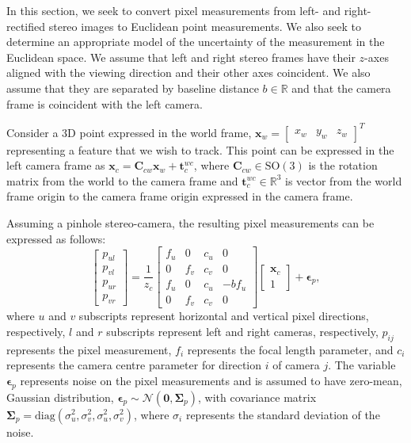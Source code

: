 \documentclass[lettersize,journal]{IEEEtran}
\newcommand{\diag}[1]{\mbox{diag}\left(#1\right)}
\begin{document}
In this section, we seek to convert pixel measurements from left- and right-rectified stereo images to Euclidean point measurements. We also seek to determine an appropriate model of the uncertainty of the measurement in the Euclidean space. We assume that left and right stereo frames have their $z$-axes aligned with the viewing direction and their other axes coincident. We also assume that they are separated by baseline distance $ b\in \mathbb{R} $ and that the camera frame is coincident with the left camera.  

Consider a 3D point expressed in the world frame, $ \bm{x}_w = \begin{bmatrix} x_w & y_w & z_w  \end{bmatrix}^T $ representing a feature that we wish to track. This point can be expressed in the left camera frame as  $ \bm{x}_c = \bm{C}_{cw} \bm{x}_w + \bm{t}^{wc}_c $, where $ \bm{C}_{cw} \in \mbox{SO}(3)$ is the rotation matrix from the world to the camera frame and $ \bm{t}^{wc}_c \in \mathbb{R}^3 $ is vector from the world frame origin to the camera frame origin expressed in the camera frame.

Assuming a pinhole stereo-camera, the resulting pixel measurements can be expressed as follows:
\begin{equation}
	\begin{bmatrix}
		p_{ul}\\p_{vl}\\p_{ur}\\p_{vr}
	\end{bmatrix} = \frac{1}{z_c}\begin{bmatrix}
		f_{u} & 0 & c_{u} & 0\\
		0 & f_{v} & c_{v} & 0\\
		f_{u} & 0 & c_{u} & -b f_{u}\\
		0 & f_{v} & c_{v} & 0
	\end{bmatrix} \begin{bmatrix}
	\bm{x}_c \\ 1
	\end{bmatrix} + \bm{\epsilon}_{p},
\end{equation}
where $ u $ and $ v $ subscripts represent horizontal and vertical pixel directions, respectively, $ l $ and $ r $ subscripts represent left and right cameras, respectively, $ p_{ij} $ represents the pixel measurement, $ f_{i} $ represents the focal length parameter, and $ c_{i} $ represents the camera centre parameter for direction $ i $ of camera $ j $. The variable $ \bm{\epsilon}_{p} $ represents noise on the pixel measurements and is assumed to have zero-mean, Gaussian distribution,
$ \bm{\epsilon}_{p} \sim \mathcal{N}(\bm{0}, \bm{\Sigma}_p) $,
with covariance matrix $ \bm{\Sigma}_p = \diag{\sigma_u^2 ,\sigma_v^2,\sigma_u^2, \sigma_v^2} $, where $ \sigma_i $ represents the standard deviation of the noise. 
\end{document}
